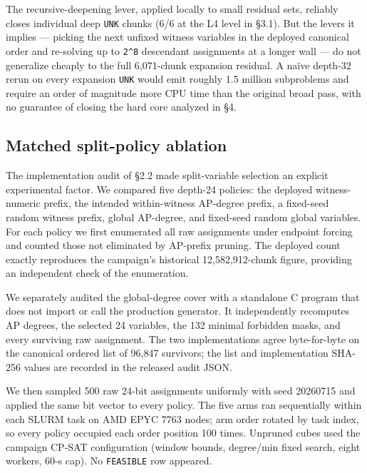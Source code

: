 The recursive-deepening lever, applied locally to small residual sets,
reliably closes individual deep \texttt{UNK} chunks (6/6 at the L4 level
in §3.1). But the levers it implies --- picking the next unfixed witness
variables in the deployed canonical order and re-solving up to
\texttt{2\^{}8} descendant assignments at a longer wall ---
do not
generalize cheaply to the full 6,071-chunk expansion residual. A
naïve depth-32 rerun on every expansion \texttt{UNK} would emit roughly
1.5 million subproblems and require an order of magnitude more CPU
time than the original broad pass, with no guarantee of closing the
hard core analyzed in §4.

\subsection{Matched split-policy ablation}\label{split-policy-ablation}

The implementation audit of §2.2 made split-variable selection an explicit
experimental factor. We compared five depth-24 policies: the deployed
witness-numeric prefix, the intended within-witness AP-degree prefix, a
fixed-seed random witness prefix, global AP-degree, and fixed-seed random
global variables. For each policy we first enumerated all raw assignments
under endpoint forcing and counted those not eliminated by AP-prefix pruning.
The deployed count exactly reproduces the campaign's historical
12,582,912-chunk figure, providing an independent check of the enumeration.

We separately audited the global-degree cover with a standalone C program
that does not import or call the production generator. It independently
recomputes AP degrees, the selected 24 variables, the 132 minimal forbidden
masks, and every surviving raw assignment. The two implementations agree
byte-for-byte on the canonical ordered list of 96,847 survivors; the list and
implementation SHA-256 values are recorded in the released audit JSON.

We then sampled 500 raw 24-bit assignments uniformly with seed 20260715 and
applied the same bit vector to every policy. The five arms ran sequentially
within each SLURM task on AMD EPYC 7763 nodes; arm order rotated by task index,
so every policy occupied each order position 100 times. Unpruned cubes used
the campaign CP-SAT configuration (window bounds, degree/min fixed search,
eight workers, 60-s cap). No \texttt{FEASIBLE} row appeared.

